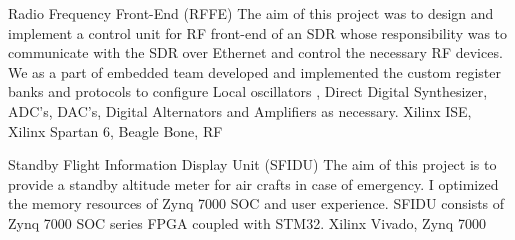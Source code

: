 \begin{projects}
  \emptySeparator
  \project
	{Radio Frequency Front-End (RFFE)}{}
	{{} {}{} }
	{The aim of this project was to design and implement a control unit for RF front-end of an SDR whose responsibility was to communicate with the SDR over Ethernet and control the necessary RF devices. We as a part of embedded team developed and implemented the custom register banks and protocols to configure Local oscillators , Direct Digital Synthesizer, ADC's, DAC's, Digital Alternators and Amplifiers as necessary.}
	{Xilinx ISE, Xilinx Spartan 6, Beagle Bone, RF}

\emptySeparator
  
	\project
	{Standby Flight Information Display Unit (SFIDU)}{}
	{{} {}{} }
	{The aim of this project is to provide a standby altitude meter for air crafts in case of emergency. I optimized the memory resources of Zynq 7000 SOC and user experience. SFIDU consists of Zynq 7000 SOC series FPGA coupled with STM32.}
	{Xilinx Vivado, Zynq 7000}
	
\emptySeparator
 
\end{projects}